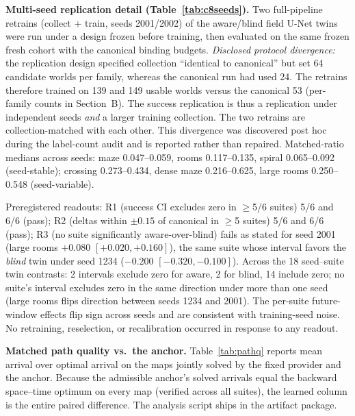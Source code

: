 \documentclass[letterpaper]{article} %
\begin{document}
\textbf{Multi-seed replication detail (Table~\ref{tab:c8seeds}).} Two full-pipeline retrains (collect + train, seeds 2001/2002) of the aware/blind field U-Net twins were run under a design frozen before training, then evaluated on the same frozen fresh cohort with the canonical binding budgets. \emph{Disclosed protocol divergence:} the replication design specified collection ``identical to canonical'' but set 64 candidate worlds per family, whereas the canonical run had used 24. The retrains therefore trained on 139 and 149 usable worlds versus the canonical 53 (per-family counts in Section~B). The success replication is thus a replication under independent seeds \emph{and} a larger training collection. The two retrains are collection-matched with each other. This divergence was discovered post hoc during the label-count audit and is reported rather than repaired. Matched-ratio medians across seeds: maze 0.047--0.059, rooms 0.117--0.135, spiral 0.065--0.092 (seed-stable); crossing 0.273--0.434, dense maze 0.216--0.625, large rooms 0.250--0.548 (seed-variable).

Preregistered readouts: R1 (success CI excludes zero in $\geq$5/6 suites) 5/6 and 6/6 (pass); R2 (deltas within $\pm 0.15$ of canonical in $\geq$5 suites) 5/6 and 6/6 (pass); R3 (no suite significantly aware-over-blind) fails as stated for seed 2001 (large rooms $+0.080$ $[+0.020,+0.160]$), the same suite whose interval favors the \emph{blind} twin under seed 1234 ($-0.200$ $[-0.320,-0.100]$). Across the 18 seed--suite twin contrasts: 2 intervals exclude zero for aware, 2 for blind, 14 include zero; no suite's interval excludes zero in the same direction under more than one seed (large rooms flips direction between seeds 1234 and 2001). The per-suite future-window effects flip sign across seeds and are consistent with training-seed noise. No retraining, reselection, or recalibration occurred in response to any readout.

\textbf{Matched path quality vs.\ the anchor.} Table~\ref{tab:pathq} reports mean arrival over optimal arrival on the maps jointly solved by the fixed provider and the anchor. Because the admissible anchor's solved arrivals equal the backward space--time optimum on every map (verified across all suites), the learned column is the entire paired difference. The analysis script ships in the artifact package.
\end{document}
